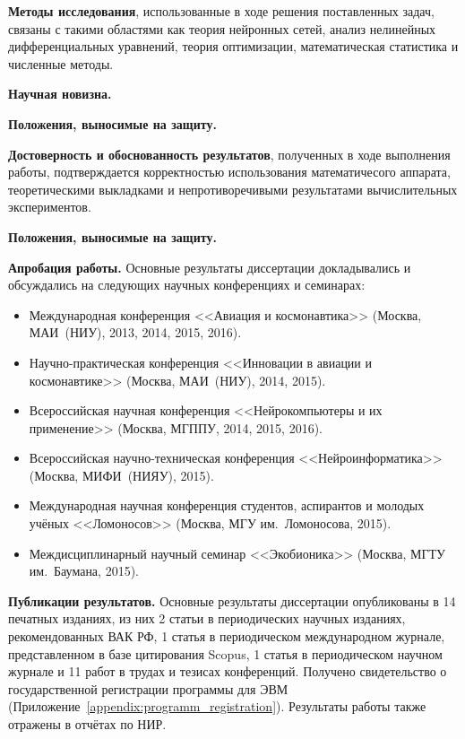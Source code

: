 \textbf{Методы исследования}, использованные в ходе решения поставленных задач, связаны с такими областями как теория нейронных сетей, анализ нелинейных дифференциальных уравнений, теория оптимизации, математическая статистика и численные методы.

\textbf{Научная новизна.}  %

\textbf{Положения, выносимые на защиту.} 

\textbf{Достоверность и обоснованность результатов}, полученных в ходе выполнения работы, подтверждается корректностью использования математичесого аппарата, теоретическими выкладками и непротиворечивыми результатами вычислительных экспериментов.

\textbf{Положения, выносимые на защиту.} 

\textbf{Апробация работы.} Основные результаты диссертации докладывались и обсуждались на следующих научных конференциях и семинарах:
\begin{itemize}[label=$\bullet$]
    \item Международная конференция <<Авиация и космонавтика>> (Москва, МАИ~(НИУ), 2013, 2014, 2015, 2016).
    \item Научно-практическая конференция <<Инновации в авиации и космонавтике>> (Москва, МАИ~(НИУ), 2014, 2015).
    \item Всероссийская научная конференция <<Нейрокомпьютеры и их применение>> (Москва, МГППУ, 2014, 2015, 2016).
    \item Всероссийская научно-техническая конференция <<Нейроинформатика>> (Москва, МИФИ~(НИЯУ), 2015).
    \item Международная научная конференция студентов, аспирантов и молодых учёных <<Ломоносов>> (Москва, МГУ им.~Ломоносова, 2015).
    \item Междисциплинарный научный семинар <<Экобионика>> (Москва, МГТУ им.~Баумана, 2015).
\end{itemize}

\textbf{Публикации результатов.} Основные результаты диссертации опубликованы в 14 печатных изданиях, из них 2 статьи в периодических научных изданиях, рекомендованных ВАК РФ, 1 статья в периодическом международном журнале, представленном в базе цитирования Scopus, 1 статья в периодическом научном журнале и 11 работ в трудах и тезисах конференций. Получено свидетельство о государственной регистрации программы для ЭВМ (Приложение~\ref{appendix:programm_registration}). Результаты работы также отражены в отчётах по НИР.

